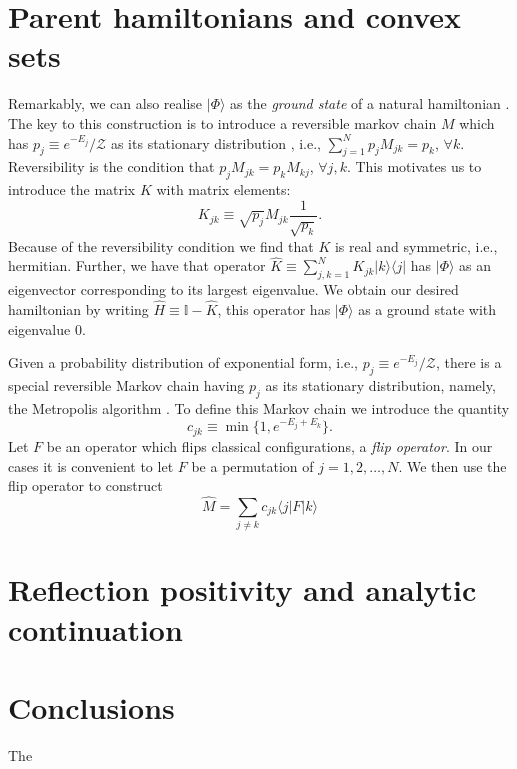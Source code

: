 \documentclass[twocolumn,lengthcheck,superscriptaddress]{revtex4-1}
\theoremstyle{definition}
\theoremstyle{remark}
\begin{document}
\section{Parent hamiltonians and convex sets}
Remarkably, we can also realise $|\Phi\rangle$ as the \emph{ground state} of a natural hamiltonian \cite{ardonne:2004a, verstraete:2006a, perez-garcia:2008a, horava:2008a}. The key to this construction is to introduce a reversible markov chain $M$ which has $p_j \equiv  e^{-E_j}/\mathcal{Z}$ as its stationary distribution \cite{norris:1997a}, i.e., $\sum_{j=1}^N p_jM_{jk} = p_k$, $\forall k$. Reversibility is the condition that $p_j M_{jk} = p_kM_{kj}$, $\forall j,k$. This motivates us to introduce the  matrix $K$ with matrix elements:
\begin{equation}
	K_{jk} \equiv \sqrt{p_j} M_{jk} \frac{1}{\sqrt{p_k}}.
\end{equation}
Because of the reversibility condition we find that $K$ is real and symmetric, i.e., hermitian. Further, we have that operator $\widehat{K} \equiv  \sum_{j,k=1}^N K_{jk}|k\rangle \langle j|$ has $|\Phi\rangle$ as an eigenvector corresponding to its largest eigenvalue. We obtain our desired hamiltonian by writing $\widehat{H} \equiv \mathbb{I} - \widehat{K}$, this operator has $|\Phi\rangle$ as a ground state with eigenvalue $0$.

Given a probability distribution of exponential form, i.e., $p_j \equiv  e^{-E_j}/\mathcal{Z}$, there is a special reversible Markov chain having $p_j$ as its stationary distribution, namely, the Metropolis algorithm \cite{metropolis:1953a}. To define this Markov chain we introduce the quantity
\begin{equation}
	c_{jk} \equiv \min\{1, e^{-E_j+E_k}\}.
\end{equation}
Let $F$ be an operator which flips classical configurations, a \emph{flip operator}. In our cases it is convenient to let $F$ be a permutation of $j=1, 2, \ldots, N$. We then use the flip operator to construct
\begin{equation}
	\widehat{M} = \sum_{j\not=k} c_{jk}\langle j|F|k\rangle
\end{equation} 

\section{Reflection positivity and analytic continuation}

\section{Conclusions}The


\end{document}
